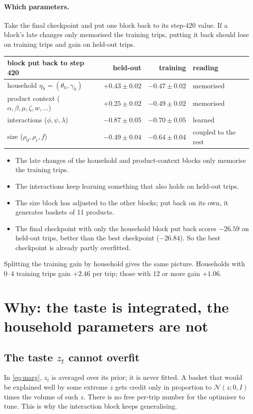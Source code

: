 \documentclass[11pt]{article}
\theoremstyle{remark}\newtheorem{remark}{Remark}
\newcommand{\N}{\mathcal{N}}
\begin{document}
\paragraph{Which parameters.} Take the final checkpoint and put one block back to its step-420
value. If a block's late changes only memorised the training trips, putting it back should lose
on training trips and gain on held-out trips.
\begin{center}\small
\begin{tabular}{lrrl}\toprule
block put back to step 420 & held-out & training & reading\\\midrule
household $\eta_h=(\theta_h,\gamma_h)$ & $+0.43\pm0.02$ & $-0.47\pm0.02$ & memorised\\
product context ($\alpha,\beta,\mu,\zeta,w,\dots$) & $+0.25\pm0.02$ & $-0.49\pm0.02$ & memorised\\
interactions ($\phi,\psi,\lambda$) & $-0.87\pm0.05$ & $-0.70\pm0.05$ & learned\\
size ($\rho_0,\rho_c,f$) & $-0.49\pm0.04$ & $-0.64\pm0.04$ & coupled to the rest\\\bottomrule
\end{tabular}
\end{center}
\begin{itemize}
\item The late changes of the household and product-context blocks only memorise the training trips.
\item The interactions keep learning something that also holds on held-out trips.
\item The size block has adjusted to the other blocks; put back on its own, it generates baskets of 11 products.
\item The final checkpoint with only the household block put back scores $-26.59$ on held-out trips,
  better than the best checkpoint ($-26.84$). So the best checkpoint is already partly overfitted.
\end{itemize}
Splitting the training gain by household gives the same picture. Households with 0--4 training trips
gain $+2.46$ per trip; those with 12 or more gain $+1.06$.

\section{Why: the taste is integrated, the household parameters are not}

\subsection{\texorpdfstring{The taste $z_t$ cannot overfit}{The taste z cannot overfit}}
In \eqref{eq:marg}, $z_t$ is averaged over its prior; it is never fitted. A basket that would be
explained well by some extreme $z$ gets credit only in proportion to $\N(z;0,I)$ times the volume of
such $z$. There is no free per-trip number for the optimiser to tune. This is why the interaction
block keeps generalising.
\end{document}
